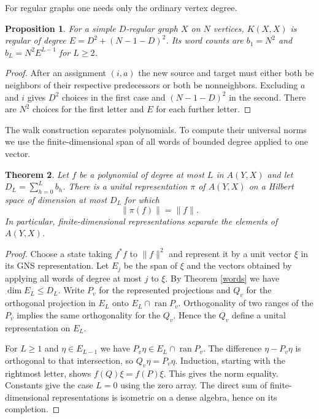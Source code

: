\documentclass[11pt,a4paper]{article}
\newtheorem{thm}{Theorem}[section]
\newtheorem{prop}[thm]{Proposition}
\begin{document}
For regular graphs one needs only the ordinary vertex degree.

\begin{prop}\label{regular}
For a simple $D$-regular graph $X$ on $N$ vertices, $K(X,X)$ is regular of degree $E=D^2+(N-1-D)^2$. Its word counts are $b_1=N^2$ and $b_L=N^2E^{L-1}$ for $L\geq2$.
\end{prop}
\begin{proof}
After an assignment $(i,a)$ the new source and target must either both be neighbors of their respective predecessors or both be nonneighbors. Excluding $a$ and $i$ gives $D^2$ choices in the first case and $(N-1-D)^2$ in the second. There are $N^2$ choices for the first letter and $E$ for each further letter.
\end{proof}

The walk construction separates polynomials. To compute their universal norms we use the finite-dimensional span of all words of bounded degree applied to one vector.

\begin{thm}\label{norm}
Let $f$ be a polynomial of degree at most $L$ in $A(Y,X)$ and let $D_L=\sum_{h=0}^L b_h$. There is a unital representation $\pi$ of $A(Y,X)$ on a Hilbert space of dimension at most $D_L$ for which
\[
 \|\pi(f)\|=\|f\|.
\]
In particular, finite-dimensional representations separate the elements of $A(Y,X)$.
\end{thm}
\begin{proof}
Choose a state taking $f^*f$ to $\|f\|^2$ and represent it by a unit vector $\xi$ in its GNS representation. Let $E_j$ be the span of $\xi$ and the vectors obtained by applying all words of degree at most $j$ to $\xi$. By Theorem \ref{words} we have $\dim E_L\leq D_L$. Write $P_v$ for the represented projections and $Q_v$ for the orthogonal projection in $E_L$ onto $E_L\cap\operatorname{ran}P_v$. Orthogonality of two ranges of the $P_v$ implies the same orthogonality for the $Q_v$. Hence the $Q_v$ define a unital representation on $E_L$.

For $L\geq1$ and $\eta\in E_{L-1}$ we have $P_v\eta\in E_L\cap\operatorname{ran}P_v$. The difference $\eta-P_v\eta$ is orthogonal to that intersection, so $Q_v\eta=P_v\eta$. Induction, starting with the rightmost letter, shows $f(Q)\xi=f(P)\xi$. This gives the norm equality. Constants give the case $L=0$ using the zero array. The direct sum of finite-dimensional representations is isometric on a dense algebra, hence on its completion.
\end{proof}
\end{document}
